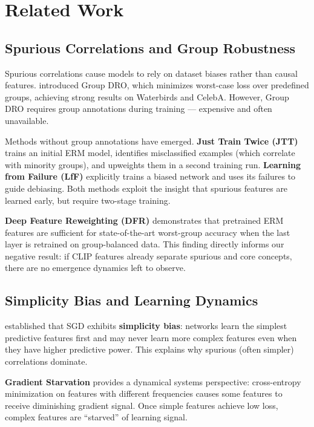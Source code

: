 \section{Related Work}

\subsection{Spurious Correlations and Group Robustness}

Spurious correlations cause models to rely on dataset biases rather than causal features. \citet{sagawa2020distributionally} introduced Group DRO, which minimizes worst-case loss over predefined groups, achieving strong results on Waterbirds and CelebA. However, Group DRO requires group annotations during training --- expensive and often unavailable.

Methods without group annotations have emerged. \textbf{Just Train Twice (JTT)} \citep{liu2021just} trains an initial ERM model, identifies misclassified examples (which correlate with minority groups), and upweights them in a second training run. \textbf{Learning from Failure (LfF)} \citep{nam2020learning} explicitly trains a biased network and uses its failures to guide debiasing. Both methods exploit the insight that spurious features are learned early, but require two-stage training.

\textbf{Deep Feature Reweighting (DFR)} \citep{kirichenko2022last} demonstrates that pretrained ERM features are sufficient for state-of-the-art worst-group accuracy when the last layer is retrained on group-balanced data. This finding directly informs our negative result: if CLIP features already separate spurious and core concepts, there are no emergence dynamics left to observe.

\subsection{Simplicity Bias and Learning Dynamics}

\citet{shah2020pitfalls} established that SGD exhibits \textbf{simplicity bias}: networks learn the simplest predictive features first and may never learn more complex features even when they have higher predictive power. This explains why spurious (often simpler) correlations dominate.

\textbf{Gradient Starvation} \citep{pezeshki2021gradient} provides a dynamical systems perspective: cross-entropy minimization on features with different frequencies causes some features to receive diminishing gradient signal. Once simple features achieve low loss, complex features are ``starved'' of learning signal.

